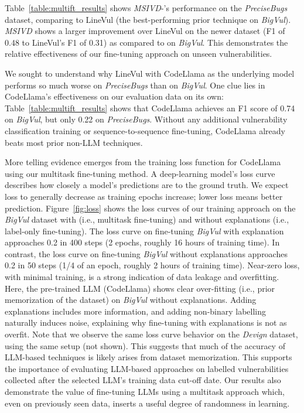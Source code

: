 \documentclass[12pt,openany,oneside,table]{cmuthesis}
\begin{document}
Table~\ref{table:multift_results} shows \textit{MSIVD}-'s performance on the \textit{PreciseBugs} dataset, comparing to LineVul (the best-performing prior technique on \textit{BigVul}). \textit{MSIVD} shows a larger improvement over LineVul on the newer dataset (F1 of 0.48 to LineVul's F1 of 0.31) as compared to on \textit{BigVul}.  This demonstrates the relative effectiveness of our fine-tuning approach on unseen vulnerabilities.

We sought to understand why LineVul with CodeLlama as the underlying model performs so much worse on \textit{PreciseBugs} than on \textit{BigVul}. 
One clue lies in CodeLlama's effectiveness on our evaluation data  on its own: Table~\ref{table:multift_results} shows that CodeLlama achieves an F1 score of 0.74 on \textit{BigVul}, but only 0.22 on \textit{PreciseBugs}. Without any additional vulnerability classification training or sequence-to-sequence fine-tuning, CodeLlama already beats most prior non-LLM techniques.

More telling evidence emerges from the training loss function for CodeLlama using our multitask fine-tuning method.
A deep-learning model's loss curve describes how closely a model's predictions are to the ground truth.  We expect loss to generally decrease as training epochs increase; lower loss means better prediction. 
Figure~\ref{fig:loss} shows the loss curves of our training approach on the \textit{BigVul} dataset with (i.e., multitask  fine-tuning) and without explanations (i.e., label-only fine-tuning).
The loss curve on fine-tuning \textit{BigVul} with explanation approaches 0.2 in 400 steps (2 epochs, roughly 16 hours of training time).
In contrast, the loss curve on fine-tuning \textit{BigVul} without explanations approaches 0.2 in 50 steps (1/4 of an epoch, roughly 2 hours of training time). 
Near-zero loss, with minimal training, is a strong indication of data leakage and overfitting.  Here, the pre-trained LLM (CodeLlama) shows clear over-fitting (i.e., prior memorization of the dataset) on \textit{BigVul} without explanations.  Adding explanations includes more information, and adding non-binary labelling naturally induces noise, explaining why fine-tuning with explanations is not as overfit. 
Note that we observe the same loss curve behavior on the \emph{Devign} dataset, using the same setup (not shown). 
This suggests that much of the accuracy of LLM-based techniques is likely arises from dataset memorization. This supports the importance of evaluating LLM-based approaches on labelled vulnerabilities collected after the selected LLM's training data cut-off date. Our results also demonstrate the value of fine-tuning LLMs using a multitask approach which, even on previously seen data, inserts a useful degree of randomness in learning.
\end{document}
